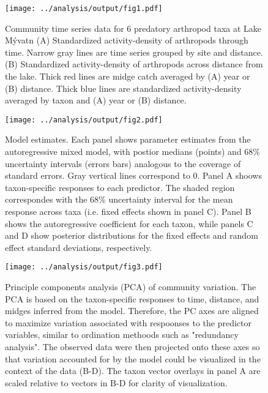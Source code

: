 \documentclass[12pt]{article}
\begin{document}
\clearpage

\begin{figure}
\centering
\texttt{[image: ../analysis/output/fig1.pdf]}
\caption{\label{fig:obs-data}
Community time series data for 6 predatory arthropod taxa at Lake M\'{y}vatn
(A) Standardized activity-density of arthropods through time.
Narrow gray lines are time series grouped by site and distance.
(B) Standardized activity-density of arthropods across distance from the lake.
Thick red lines are midge catch averaged by (A) year or (B) distance.
Thick blue lines are standardized activity-density averaged by taxon and
(A) year or (B) distance.
}
\end{figure}




\clearpage

\begin{figure}
\centering
\texttt{[image: ../analysis/output/fig2.pdf]}
\caption{\label{fig:coefs}
Model estimates.
Each panel shows parameter estimates from the autoregressive mixed model,
with postior medians (points) and 68\% uncertainty intervals
(errors bars) analogous to the coverage of standard errors.
Gray vertical lines correspond to 0.
Panel A shoows taxon-specific responses to each predictor.
The shaded region correspondes with the 68\% uncertainty interval
for the mean response across taxa (i.e. fixed effects shown in panel C).
Panel B shows the autoregressive coefficient for each taxon,
while panels C and D show posterior distributions for
the fixed effects and random effect standard deviations, respectively.
}
\end{figure}



\clearpage

\begin{figure}
\centering
\texttt{[image: ../analysis/output/fig3.pdf]}
\caption{\label{fig:pca}
Principle components analysis (PCA) of community variation.
The PCA is based on the taxon-specific responses to time, distance, and midges inferred
from the model.
Therefore, the PC axes are aligned to maximize variation associated with
respoonses to the predictor variables, similar to ordination methoods
such as "redundancy analysis".
The observed data were then projected onto these axes so that variation accounted for
by the model could be visualized in the context of the data (B-D).
The taxon vector overlays in panel A are scaled relative to vectors in B-D
for clarity of visualization.
}
\end{figure}
\end{document}
